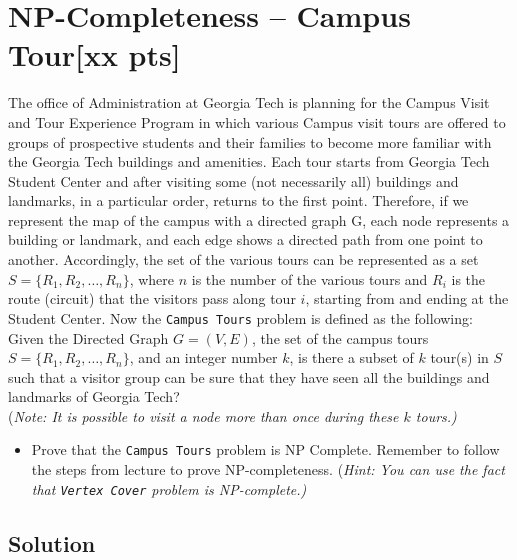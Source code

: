 \documentclass{article}
\begin{document}
\section{NP-Completeness -- Campus Tour[xx pts]} %
The office of Administration at Georgia Tech is planning for the Campus Visit and Tour Experience Program in which various Campus visit tours are offered to groups of prospective students and their families to become more familiar with the Georgia Tech buildings and amenities. Each tour starts from Georgia Tech Student Center and after visiting some (not necessarily all) buildings and landmarks, in a particular order, returns to the first point. Therefore, if we represent the map of the campus with a directed graph G, each node represents a building or landmark, and each edge shows a directed path from one point to another. Accordingly, the set of the various tours can be represented as a set $S = \{R_1, R_2, \ldots, R_n\}$, where $n$ is the number of the various tours and $R_i$ is the route (circuit) that the visitors pass along tour $i$, starting from and ending at the Student Center. Now the \texttt{Campus Tours} problem is defined as the following:\\

Given the Directed Graph $G=(V,E)$, the set of the campus tours $S = \{R_1, R_2, \ldots, R_n\}$, and an integer number $k$, is there a subset of $k$  tour(s) in $S$ such that a visitor group can be sure that they have seen all the buildings and landmarks of Georgia Tech?\\
(\textit{Note: It is possible to visit a node more than once during these $k$ tours.)}\\

\begin{itemize}
	\item[] Prove that the \texttt{Campus Tours} problem is NP Complete. Remember to follow the steps from lecture to prove NP-completeness. (\textit{Hint: You can use the fact that \texttt{Vertex Cover} problem is NP-complete.)}
\end{itemize}



\subsection*{Solution}
\color{blue}
\end{document}
